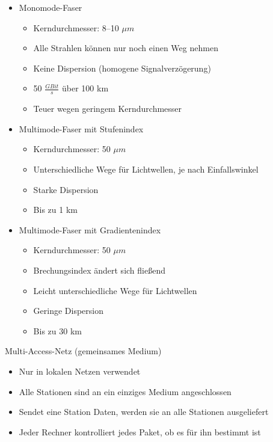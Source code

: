 \begin{itemize}
    \item Monomode-Faser
    \begin{itemize}
        \item Kerndurchmesser: 8--10 $\mu m$
        \item Alle Strahlen können nur noch einen Weg nehmen
        \item Keine Dispersion (homogene Signalverzögerung)
        \item 50 $\frac{GBit}{s}$ über 100 km
        \item Teuer wegen geringem Kerndurchmesser
    \end{itemize}
    \item Multimode-Faser mit Stufenindex
    \begin{itemize}
        \item Kerndurchmesser: 50 $\mu m$
        \item Unterschiedliche Wege für Lichtwellen, je nach Einfallswinkel
        \item Starke Dispersion
        \item Bis zu 1 km
    \end{itemize}
    \item Multimode-Faser mit Gradientenindex
    \begin{itemize}
        \item Kerndurchmesser: 50 $\mu m$
        \item Brechungsindex ändert sich fließend
        \item Leicht unterschiedliche Wege für Lichtwellen
        \item Geringe Dispersion
        \item Bis zu 30 km
    \end{itemize}
\end{itemize}

Multi-Access-Netz (gemeinsames Medium)
\begin{itemize}
    \item Nur in lokalen Netzen verwendet
    \item Alle Stationen sind an ein einziges Medium angeschlossen
    \item Sendet eine Station Daten, werden sie an alle Stationen ausgeliefert
    \item Jeder Rechner kontrolliert jedes Paket, ob es für ihn bestimmt ist
\end{itemize}

